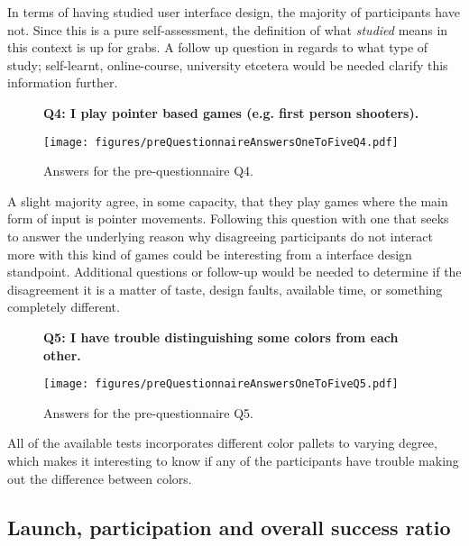     In terms of having studied user interface design, the majority of
    participants have not. Since this is a pure self-assessment, the
    definition of what \textit{studied} means in this context is up for
    grabs. A follow up question in regards to what type of study;
    self-learnt, online-course, university etcetera would be needed clarify
    this information further.

    \begin{figure}[h!]
      \textbf{Q4: I play pointer based games (e.g. first person shooters).}
      \begin{center}
        \texttt{[image: figures/preQuestionnaireAnswersOneToFiveQ4.pdf]}
        \caption{Answers for the pre-questionnaire Q4.}
      \end{center}
    \end{figure}

    A slight majority agree, in some capacity, that they play games where
    the main form of input is pointer movements. Following this question
    with one that seeks to answer the underlying reason why disagreeing
    participants do not interact more with this kind of games could be
    interesting from a interface design standpoint. Additional questions or
    follow-up would be needed to determine if the disagreement it is a
    matter of taste, design faults, available time, or something completely
    different.

    \begin{figure}[h!]
      \textbf{Q5: I have trouble distinguishing some colors from each other.}
      \begin{center}
        \texttt{[image: figures/preQuestionnaireAnswersOneToFiveQ5.pdf]}
        \caption{Answers for the pre-questionnaire Q5.}
      \end{center}
    \end{figure}

    All of the available tests incorporates different color pallets to
    varying degree, which makes it interesting to know if any of the
    participants have trouble making out the difference between colors.

  \subsection{Launch, participation and overall success ratio}

